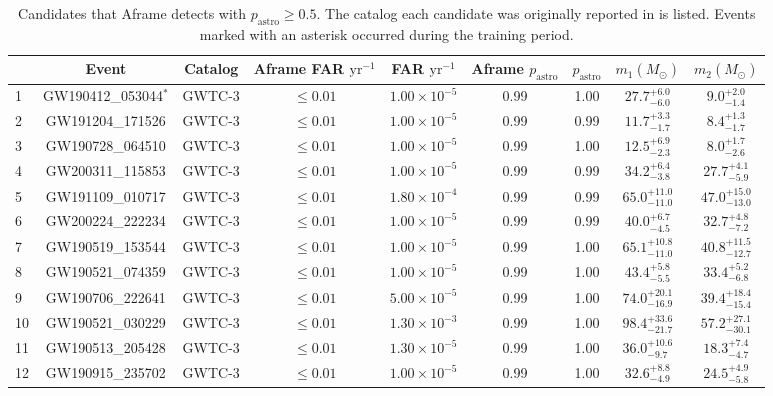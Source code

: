 \begin{table*}[ht]
\centering
\caption{Candidates that Aframe detects with $p_\mathrm{astro} \geq 0.5$. The catalog each candidate was originally reported in is listed. Events marked with an asterisk occurred during the training period.}
\label{table:significant}
\begin{tabular}{!{\vrule width 1pt}lcccccccc!{\vrule width 1pt}}
\toprule[1pt]
 & Event & Catalog & Aframe FAR $\mathrm{yr}^{-1}$ & FAR $\mathrm{yr}^{-1}$ & Aframe $p_\mathrm{astro}$ & $p_\mathrm{astro}$ & $m_1 (M_{\odot})$ & $m_2 (M_{\odot})$ \\
 & GW190412\_053044$^{*}$ & GWTC-3 & $\leq 0.01$ & $1.00 \times 10^{-5}$ & 0.99 & 1.00 & $27.7^{+6.0}_{-6.0}$ & $9.0^{+2.0}_{-1.4}$ \\
2 & GW191204\_171526 & GWTC-3 & $\leq 0.01$ & $1.00 \times 10^{-5}$ & 0.99 & 0.99 & $11.7^{+3.3}_{-1.7}$ & $8.4^{+1.3}_{-1.7}$ \\
3 & GW190728\_064510 & GWTC-3 & $\leq 0.01$ & $1.00 \times 10^{-5}$ & 0.99 & 1.00 & $12.5^{+6.9}_{-2.3}$ & $8.0^{+1.7}_{-2.6}$ \\
4 & GW200311\_115853 & GWTC-3 & $\leq 0.01$ & $1.00 \times 10^{-5}$ & 0.99 & 0.99 & $34.2^{+6.4}_{-3.8}$ & $27.7^{+4.1}_{-5.9}$ \\
5 & GW191109\_010717 & GWTC-3 & $\leq 0.01$ & $1.80 \times 10^{-4}$ & 0.99 & 0.99 & $65.0^{+11.0}_{-11.0}$ & $47.0^{+15.0}_{-13.0}$ \\
6 & GW200224\_222234 & GWTC-3 & $\leq 0.01$ & $1.00 \times 10^{-5}$ & 0.99 & 0.99 & $40.0^{+6.7}_{-4.5}$ & $32.7^{+4.8}_{-7.2}$ \\
7 & GW190519\_153544 & GWTC-3 & $\leq 0.01$ & $1.00 \times 10^{-5}$ & 0.99 & 1.00 & $65.1^{+10.8}_{-11.0}$ & $40.8^{+11.5}_{-12.7}$ \\
8 & GW190521\_074359 & GWTC-3 & $\leq 0.01$ & $1.00 \times 10^{-5}$ & 0.99 & 1.00 & $43.4^{+5.8}_{-5.5}$ & $33.4^{+5.2}_{-6.8}$ \\
9 & GW190706\_222641 & GWTC-3 & $\leq 0.01$ & $5.00 \times 10^{-5}$ & 0.99 & 1.00 & $74.0^{+20.1}_{-16.9}$ & $39.4^{+18.4}_{-15.4}$ \\
10 & GW190521\_030229 & GWTC-3 & $\leq 0.01$ & $1.30 \times 10^{-3}$ & 0.99 & 1.00 & $98.4^{+33.6}_{-21.7}$ & $57.2^{+27.1}_{-30.1}$ \\
11 & GW190513\_205428 & GWTC-3 & $\leq 0.01$ & $1.30 \times 10^{-5}$ & 0.99 & 1.00 & $36.0^{+10.6}_{-9.7}$ & $18.3^{+7.4}_{-4.7}$ \\
12 & GW190915\_235702 & GWTC-3 & $\leq 0.01$ & $1.00 \times 10^{-5}$ & 0.99 & 1.00 & $32.6^{+8.8}_{-4.9}$ & $24.5^{+4.9}_{-5.8}$ \\

\end{tabular}
\end{table*}
